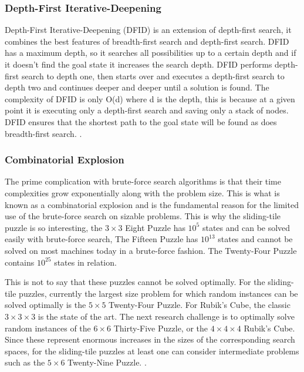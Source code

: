 \documentclass[review]{cmpreport}
\begin{document}
\subsubsection{Depth-First Iterative-Deepening}
Depth-First Iterative-Deepening (DFID) is an extension of depth-first search, it combines the best features of breadth-first search and depth-first search. DFID has a maximum depth, so it searches all possibilities up to a certain depth and if it doesn't find the goal state it increases the search depth. DFID performs depth-first search to depth one, then starts over and executes a depth-first search to depth two and continues deeper and deeper until a solution is found. The complexity of DFID is only O(d) where d is the depth, this is because at a given point it is executing only a depth-first search and saving only a stack of nodes. DFID ensures that the shortest path to the goal state will be found as does breadth-first search. \citep{DBLP:conf/otm/MeissnerB11}.

\subsubsection{Combinatorial Explosion}
The prime complication with brute-force search algorithms is that their time complexities grow exponentially along with the problem size. This is what is known as a combinatorial explosion and is the fundamental reason for the limited use of the brute-force search on sizable problems. This is why the sliding-tile puzzle is so interesting, the $3\times3$ Eight Puzzle has $10^5$ states and can be solved easily with brute-force search, The Fifteen Puzzle has $10^{13}$ states and cannot be solved on most machines today in a brute-force fashion. The Twenty-Four Puzzle contains $10^{25}$ states in relation. 

This is not to say that these puzzles cannot be solved optimally. For the sliding-tile puzzles, currently the largest size problem for which random instances can be solved optimally is the $5\times 5$ Twenty-Four Puzzle. For Rubik's Cube, the classic $3 \times 3 \times 3$ is the state of the art. The next research challenge is to optimally solve random instances of the $6 \times 6$ Thirty-Five Puzzle, or the $4 \times 4 \times 4$ Rubik's Cube. Since these represent enormous increases in the sizes of the corresponding search spaces, for the sliding-tile puzzles at least one can consider intermediate problems such as the $5 \times 6$ Twenty-Nine Puzzle. \citep{DBLP:journals/aicom/BorrajoFKLLRS14}. 
\end{document}
